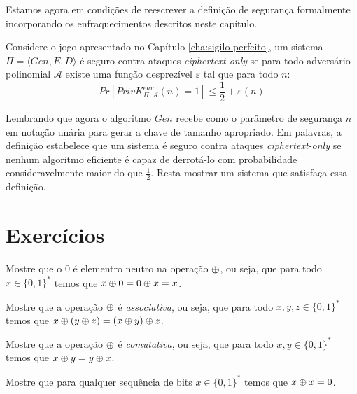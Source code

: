 Estamos agora em condições de reescrever a definição de segurança formalmente incorporando os enfraquecimentos descritos neste capítulo.

\begin{definition}
  Considere o jogo apresentado no Capítulo \ref{cha:sigilo-perfeito}, um sistema $\Pi = \langle Gen, E, D \rangle$ é seguro contra ataques {\em ciphertext-only} se para todo adversário polinomial $\mathcal{A}$ existe uma função desprezível $\varepsilon$ tal que para todo $n$:
\begin{displaymath}
  Pr[PrivK^{eav}_{\Pi, \mathcal{A}}(n) = 1] \leq \frac{1}{2} + \varepsilon(n)
\end{displaymath}
\end{definition}

Lembrando que agora o algoritmo $Gen$ recebe como o parâmetro de segurança $n$ em notação unária para gerar a chave de tamanho apropriado.
Em palavras, a definição estabelece que um sistema é seguro contra ataques {\em ciphertext-only} se nenhum algoritmo eficiente é capaz de derrotá-lo com probabilidade consideravelmente maior do que $\frac{1}{2}$.
Resta mostrar um sistema que satisfaça essa definição.


\section{Exercícios}
\label{sec:exercicios}

\begin{exercicio}
  Mostre que o $0$ é elementro neutro na operação $\oplus$, ou seja, que para todo $x \in \{0,1\}^*$ temos que $x \oplus 0 = 0 \oplus x = x$.
\end{exercicio}

\begin{exercicio}
  Mostre que a operação $\oplus$ é {\em associativa}, ou seja, que para todo $x,y,z \in \{0,1\}^*$ temos que $x \oplus (y \oplus z) = (x \oplus y) \oplus z$.
\end{exercicio}

\begin{exercicio}
  Mostre que a operação $\oplus$ é {\em comutativa}, ou seja, que para todo $x,y \in \{0,1\}^*$ temos que $x \oplus y = y \oplus x$.
\end{exercicio}

\begin{exercicio}
  Mostre que para qualquer sequência de bits $x \in \{0,1\}^*$ temos que $x \oplus x = 0$.
\end{exercicio}

